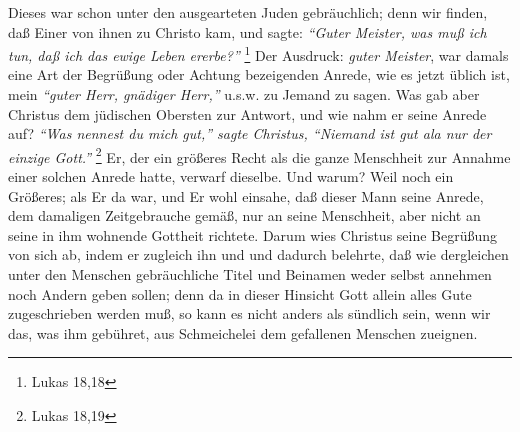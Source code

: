 Dieses war schon unter den ausgearteten Juden
gebräuchlich; denn wir finden, daß
Einer von ihnen zu Christo kam, und sagte:
\textit{"`Guter Meister, was muß ich tun,
daß ich das ewige Leben ererbe?"'}
\footnote{Lukas 18,18}
Der Ausdruck: \textit{guter
Meister}, war damals eine Art der Begrüßung oder Achtung bezeigenden Anrede, wie
es jetzt üblich ist, mein \textit{"`guter Herr, gnädiger Herr,"'} u.s.w. zu
Jemand zu
sagen. Was gab aber Christus dem jüdischen Obersten zur Antwort, und wie nahm er
seine Anrede auf?
\textit{"`Was nennest du mich gut,"' sagte Christus, "`Niemand ist gut
ala nur der einzige Gott."'}
\footnote{Lukas 18,19} Er, der ein größeres Recht als
die ganze Menschheit zur Annahme einer solchen Anrede hatte, verwarf dieselbe.
Und warum? Weil noch ein Größeres; als Er da war, und Er wohl einsahe, daß
dieser Mann seine Anrede, dem damaligen Zeitgebrauche gemäß, nur an seine
Menschheit, aber nicht an seine in ihm wohnende Gottheit richtete. Darum wies
Christus seine Begrüßung von sich ab, indem er zugleich ihn und und dadurch
belehrte, daß wie dergleichen unter den Menschen gebräuchliche Titel und
Beinamen weder selbst annehmen noch Andern geben sollen; denn da in dieser
Hinsicht Gott allein alles Gute zugeschrieben werden muß, so kann es nicht
anders als sündlich sein, wenn wir das, was ihm gebühret, aus Schmeichelei dem
gefallenen Menschen zueignen.

\medskip


